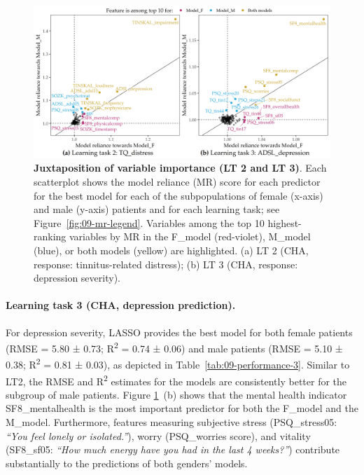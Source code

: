 \documentclass[
  oneside]{book}
\begin{document}
\begin{figure}[htb]

{\centering \includegraphics[width=1\linewidth]{figures/09-mr-lt23} 

}

\caption{\textbf{Juxtaposition of variable importance (LT 2 and LT 3)}. Each scatterplot shows the model reliance (MR) score for each predictor for the best model for each of the subpopulations of female (x-axis) and male (y-axis) patients and for each learning task; see Figure~\ref{fig:09-mr-legend}. Variables among the top 10 highest-ranking variables by MR in the F\_model (red-violet), M\_model (blue), or both models (yellow) are highlighted. (a) LT 2 (CHA, response: tinnitus-related distress); (b) LT 3 (CHA, response: depression severity).}\label{fig:09-mr-lt23}
\end{figure}

\paragraph*{Learning task 3  (CHA, depression prediction).}

For depression severity, LASSO provides the best model for both female patients (RMSE = 5.80 ± 0.73; R\textsuperscript{2} = 0.74 ± 0.06) and male patients (RMSE = 5.10 ± 0.38; R\textsuperscript{2} = 0.81 ± 0.03), as depicted in Table~\ref{tab:09-performance-3}.
Similar to LT2, the RMSE and R\textsuperscript{2} estimates for the models are consistently better for the subgroup of male patients.
Figure \ref{fig:09-mr-lt23}~(b) shows that the mental health indicator SF8\_mentalhealth is the most important predictor for both the F\_model and the M\_model.
Furthermore, features measuring subjective stress (PSQ\_stress05: \emph{``You feel lonely or isolated.''}), worry (PSQ\_worries score), and vitality (SF8\_sf05: \emph{``How much energy have you had in the last 4 weeks?''}) contribute substantially to the predictions of both genders' models.
\end{document}
